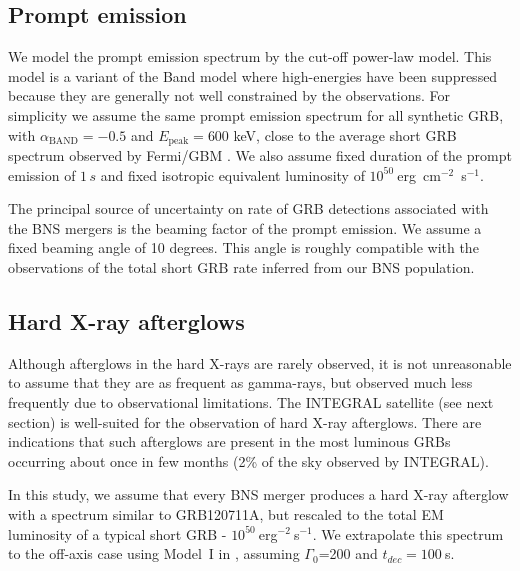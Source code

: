 \documentclass[11pt]{article}
\begin{document}
\subsection*{Prompt emission}

We model the prompt emission spectrum by the cut-off power-law model. This model
is a variant of the Band model \citep{1993ApJ...413..281B} where high-energies
have been suppressed because they are generally not well constrained by the
observations. For simplicity we assume the same prompt emission spectrum for all
synthetic GRB, with $\alpha_{\mathrm{BAND}} = - 0.5$ and $E_{\mathrm{peak}} =
600$ keV, close to the average short GRB spectrum observed by Fermi/GBM
\citep{2014ApJS..211...12G}. We also assume fixed duration of the prompt
emission of $1 \, s$ and fixed isotropic equivalent luminosity of
$10^{50}~$erg~cm$^{-2}$~s$^{-1}$.

The principal source of uncertainty on rate of GRB detections associated with
the BNS mergers is the beaming factor of the prompt emission. We assume a fixed
beaming angle of 10 degrees. This angle is roughly compatible with the observations
of the total short GRB rate inferred from our BNS population. 

\subsection*{Hard X-ray afterglows}

Although afterglows in the hard X-rays are rarely observed, it is not
unreasonable to assume that they are as frequent as gamma-rays, but observed
much less frequently due to observational limitations. The INTEGRAL satellite
(see next section) is well-suited for the observation of hard X-ray
afterglows. There are indications that such afterglows are present in the most
luminous GRBs occurring about once in few months (2\% of the sky observed by
INTEGRAL). %

In this study, we assume that every BNS merger produces a hard X-ray
afterglow with a spectrum similar to GRB120711A, but rescaled to the
total EM luminosity of a typical short GRB -
$10^{50}~$erg$^{-2}~$s$^{-1}$. We extrapolate this spectrum to the
off-axis case using Model~I in \citep{2016arXiv160606124P}, assuming
$\Gamma_0$=200 and $t_{dec}=100~$s.
\end{document}
